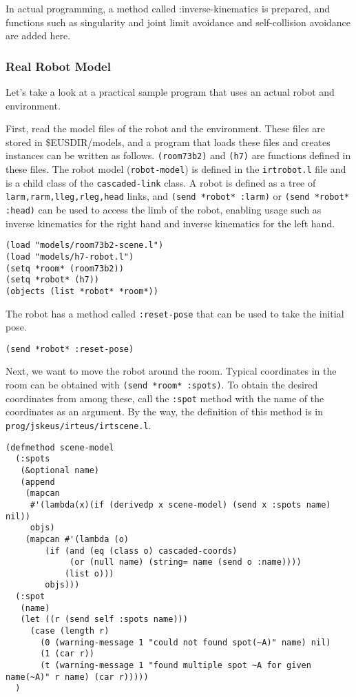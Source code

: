 In actual programming, a method called :inverse-kinematics is prepared, and functions such as singularity and joint limit avoidance and self-collision avoidance are added here.

\subsubsection{Real Robot Model}

Let's take a look at a practical sample program that uses an actual robot and environment.

First, read the model files of the robot and the environment. These files are stored in \${EUSDIR}/models, and a program that loads these files and creates instances can be written as follows. \verb|(room73b2)| and \verb|(h7)| are functions defined in these files.
The robot model (\verb|robot-model|) is defined in the \verb|irtrobot.l| file and is a child class of the \verb|cascaded-link| class.
A robot is defined as a tree of \verb|larm,rarm,lleg,rleg,head| links, and \verb|(send *robot* :larm)| or \verb|(send *robot* :head)| can be used to access the limb of the robot, enabling usage such as inverse kinematics for the right hand and inverse kinematics for the left hand.

{\baselineskip=10pt
\begin{verbatim}
(load "models/room73b2-scene.l")
(load "models/h7-robot.l")
(setq *room* (room73b2))
(setq *robot* (h7))
(objects (list *robot* *room*))
\end{verbatim}
}

The robot has a method called \verb|:reset-pose| that can be used to take the initial pose.
{\baselineskip=10pt
\begin{verbatim}
(send *robot* :reset-pose)
\end{verbatim}
}

Next, we want to move the robot around the room. Typical coordinates in the room can be obtained with \verb|(send *room* :spots)|. To obtain the desired coordinates from among these, call the \verb|:spot| method with the name of the coordinates as an argument.
By the way, the definition of this method is in \verb|prog/jskeus/irteus/irtscene.l|.
{\baselineskip=10pt
\begin{verbatim}
(defmethod scene-model
  (:spots
   (&optional name)
   (append
    (mapcan
     #'(lambda(x)(if (derivedp x scene-model) (send x :spots name) nil))
     objs)
    (mapcan #'(lambda (o)
		(if (and (eq (class o) cascaded-coords)
			 (or (null name) (string= name (send o :name))))
		    (list o)))
	    objs)))
  (:spot
   (name)
   (let ((r (send self :spots name)))
     (case (length r)
       (0 (warning-message 1 "could not found spot(~A)" name) nil)
       (1 (car r))
       (t (warning-message 1 "found multiple spot ~A for given name(~A)" r name) (car r)))))
  )
\end{verbatim}
}


